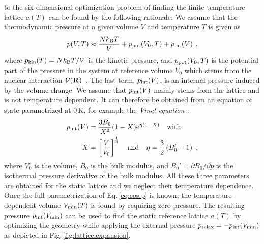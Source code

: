  to the six-dimensional optimization problem of finding the finite temperature lattice $a (T)$ can be  found by the following rationale: We assume that the thermodynamic pressure at a given volume $V$ and temperature $T$ is given as
\begin{align}
p (V, T) \approx \frac{N k_{\rm B} T}{V} + p_{\rm pot} (V_0, T) + p_{\rm int}(V)~,
\label{eq:eos.p}
\end{align}
where $p_{\rm kin} (T) = N k_{\rm B} T / V$ is the kinetic pressure, and $p_{\rm pot} (V_0, T)$ is the potential part of the pressure in the system at reference volume $V_0$ which stems from the nuclear interaction $\mathcal V ({\bf R})$~\cite{Hansen1990}. The last term, $p_{\rm int} (V)$, is an internal pressure induced by the volume change. We assume that $p_{\rm int} (V)$ mainly stems from the lattice and is not temperature dependent. It can therefore be obtained from an equation of state parametrized at 0\,K, for example the \emph{Vinet equation}~\cite{Vinet1987}:
\begin{align}
p_{\rm int} (V) 
&= \frac{3 B_0}{X^2} (1-X) {\rm e}^{\eta (1-X)} \label{eq:p.Vinet} \quad\text{with} \\ 
X &= \left[\frac{V}{V_0}\right]^{\frac{1}{3}}
\quad\text{and}\quad
\eta 
= \frac{3}{2} \left(B_0' - 1 \right)~,
\end{align}
where $V_0$ is the volume, $B_0$ is the bulk modulus, and $B_0' = \partial B_0 / \partial p$ is the isothermal pressure derivative of the bulk modulus. All these three parameters are obtained for the static lattice and we neglect their temperature dependence. Once the full parametrization of Eq.\,\eqref{eq:eos.p} is known, the temperature-dependent volume $V_{\rm min} (T)$ is found by requiring zero pressure. The resulting pressure $p_{\rm int} (V_{\rm min})$ can be used to find the static reference lattice $a(T)$ by optimizing the geometry while applying the external pressure $p_{\rm relax} = - p_{\rm int} (V_{\rm min})$ as depicted in Fig.\,\ref{fig:lattice.expansion}.
